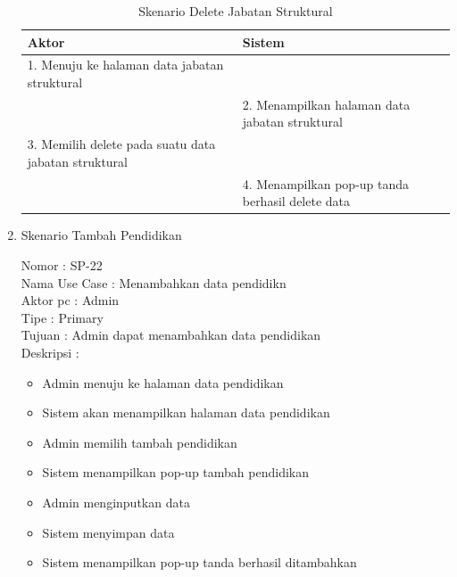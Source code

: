 \begin{enumerate}
\begin{itemize}
\end{itemize}

\begin{table}
	\caption{Skenario Delete Jabatan Struktural}
	\centering
	\begin{tabular}{ | p{55mm} | p{70mm}|}
		\hline 
		\textbf{Aktor} & \textbf{Sistem} \\
		\hline
		
		1.	Menuju ke halaman data jabatan struktural &  \\
		
		\hline
		
		&  2.	Menampilkan halaman data jabatan struktural\\
		
		\hline
		
		3. Memilih delete pada suatu data jabatan struktural& \\
		
		\hline
		
		& 4.	Menampilkan pop-up tanda berhasil delete data \\
		\hline
		
	\end{tabular}
\end{table}

\item Skenario Tambah Pendidikan

Nomor \kern 3.6pc : SP-22 \\
Nama Use Case : Menambahkan data pendidikn \\
Aktor  pc : Admin \\
Tipe \kern 4.6pc : Primary \\
Tujuan \kern 3.6pc : Admin dapat menambahkan data pendidikan \\
Deskripsi \kern 2.5pc : 

\begin{itemize}
	\item Admin menuju ke halaman data pendidikan
	\item Sistem akan menampilkan halaman data pendidikan
	\item Admin memilih tambah pendidikan
	\item Sistem menampilkan pop-up tambah pendidikan
	\item Admin menginputkan data
	\item Sistem menyimpan data
	\item Sistem menampilkan pop-up tanda berhasil ditambahkan
	
\end{itemize}


\end{enumerate}
